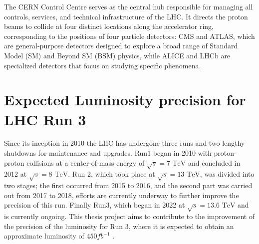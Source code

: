 The CERN Control Centre serves as the central hub responsible for managing all controls, services, and technical infrastructure of the LHC. It directs the proton beams to collide at four distinct locations along the accelerator ring, corresponding to the positions of four particle detectors: CMS and ATLAS, which are general-purpose detectors designed to explore a broad range of Standard Model (SM) and Beyond SM (BSM) physics, while ALICE and LHCb are specialized detectors that focus on studying specific phenomena.

\section{Expected  Luminosity precision for LHC Run 3}

Since its inception in 2010 the LHC has undergone three runs and two lengthy shutdowns for maintenance and upgrades. 
Run1 began in 2010 with proton-proton collisions at a center-of-mass energy of $\sqrt{s}=\text{7 TeV}$ and concluded in 2012 at  $\sqrt{s}=\text{8 TeV}$. Run 2, which took place at $\sqrt{s}=\text{13 TeV}$, was divided into two stages; the first  occurred from 2015 to 2016, and the second part  was carried out   from 2017 to 2018, efforts are currently underway to further improve the precision of this run. Finally  Run3, which began in 2022 at $\sqrt{s}=\text{13.6 TeV}$ and is currently ongoing. This thesis project aims to contribute to the improvement of the precision of the luminosity for Run 3, where it is expected to obtain an approximate luminosity of $450 fb^{-1}$ \cite{
hl-lhc}. \\

